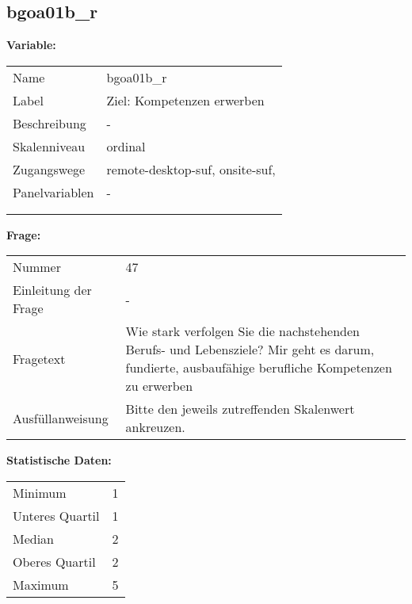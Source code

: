 	
	
	\subsection{bgoa01b\_r}
	\label{subSection:bgoa01b_r}

	\noindent\textbf{Variable:}\\
		\begin{tabular}{lL{11.3cm}}
			\label{tableVariable:bgoa01b_r}
			Name & bgoa01b\_r \\
			Label & Ziel: Kompetenzen erwerben \\
			Beschreibung & - \\
			Skalenniveau & ordinal \\
			Zugangswege &
				remote-desktop-suf,
				onsite-suf,
 \\
			Panelvariablen & -
			 \\
			 \\
 \\
		\end{tabular}

		\vspace*{1 cm}
		\noindent\textbf{Frage:}\\
		\begin{tabular}{lL{11.3cm}}
			\label{tableQuestion:bgoa01b_r}
			Nummer & 47 \\
			Einleitung der Frage & - \\
			Fragetext & Wie stark verfolgen Sie die nachstehenden Berufs- und Lebensziele?
Mir geht es darum, fundierte, ausbaufähige berufliche Kompetenzen zu erwerben \\
			Ausfüllanweisung & Bitte den jeweils zutreffenden Skalenwert ankreuzen. \\
		\end{tabular}


		\vspace*{1 cm}
		\noindent\textbf{Statistische Daten:}\\
			\begin{tabular}{ll}
				\label{tableStatistics:bgoa01b_r}
					Minimum & 1 \\
					Unteres Quartil & 1 \\
					Median & 2 \\
					Oberes Quartil & 2 \\
					Maximum & 5 \\
			\end{tabular}




